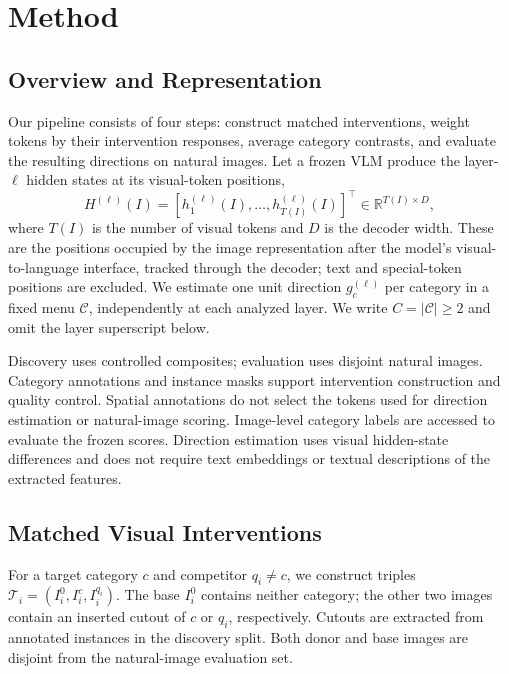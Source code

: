 \section{Method}
\label{sec:method}

\subsection{Overview and Representation}
\label{sec:method_overview}

Our pipeline consists of four steps: construct matched interventions,
weight tokens by their intervention responses, average category contrasts,
and evaluate the resulting directions on natural images.
Let a frozen VLM produce the layer-\(\ell\) hidden states at its
visual-token positions,
\begin{equation}
    H^{(\ell)}(I)
    =
    \left[h_1^{(\ell)}(I),\ldots,h_{T(I)}^{(\ell)}(I)\right]^\top
    \in\mathbb{R}^{T(I)\times D},
    \label{eq:visual_representation}
\end{equation}
where \(T(I)\) is the number of visual tokens and \(D\) is the decoder
width. These are the positions occupied by the image representation after
the model's visual-to-language interface, tracked through the decoder;
text and special-token positions are excluded. We estimate one unit
direction \(g_c^{(\ell)}\) per category in a fixed menu
\(\mathcal C\), independently at each analyzed layer. We write
\(C=|\mathcal C|\geq2\) and omit the layer superscript below.

Discovery uses controlled composites; evaluation uses disjoint natural
images. Category annotations and instance masks support intervention
construction and quality control. Spatial annotations do not select the
tokens used for direction estimation or natural-image scoring.
Image-level category labels are accessed to evaluate the frozen scores.
Direction estimation uses visual hidden-state differences and does not
require text embeddings or textual descriptions of the extracted features.

\subsection{Matched Visual Interventions}
\label{sec:matched_interventions}

For a target category \(c\) and competitor \(q_i\neq c\),
we construct triples
\(\mathcal T_i=(I_i^0,I_i^c,I_i^{q_i})\).
The base \(I_i^0\) contains neither category; the other two images contain
an inserted cutout of \(c\) or \(q_i\), respectively. Cutouts are extracted
from annotated instances in the discovery split. Both donor and base
images are disjoint from the natural-image evaluation set.

